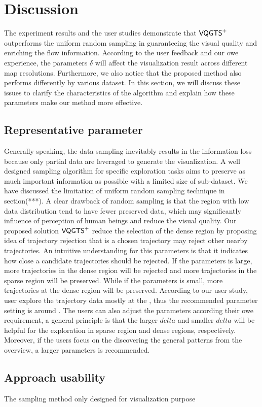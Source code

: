 \section{Discussion}

The experiment results and the user studies demonstrate that $\mathsf{VQGTS}^{+}$ outperforms the uniform random sampling in guaranteeing the visual quality and enriching the flow information. According to the user feedback and our owe experience, the parameters $\delta$ will affect the visualization result across different map resolutions. Furthermore, we also notice that the proposed method also performs differently by various dataset. In this section, we will discuss these issues to clarify the characteristics of the algorithm and explain how these parameters make our method more effective.

\subsection{Representative parameter} 
Generally speaking, the data sampling inevitably results in the information loss because only partial data are leveraged to generate the visualization. A well designed sampling algorithm for specific exploration tasks aims to preserve as much important information as possible with a limited size of sub-dataset. We have discussed the limitation of uniform random sampling technique in section(***). A clear drawback of random sampling is that the region with low data distribution tend to have fewer preserved data, which may significantly influence of perception of human beings and reduce the visual quality. Our proposed solution $\mathsf{VQGTS}^{+}$ reduce the selection of the dense region by proposing idea of trajectory rejection that is a chosen trajectory may reject other nearby trajectories. An intuitive understanding for this parameters is that it indicates how close a candidate trajectories should be rejected. If the parameters is large, more trajectories in the dense region will be rejected and more trajectories in the sparse region will be preserved. While if the parameters is small, more trajectories at the dense region will be preserved. According to our user study, user explore the trajectory data mostly at the , thus the recommended parameter setting is around . The users can also adjust the parameters according their owe requirement, a general principle is that the larger $delta$ and smaller $delta$ will be helpful for the exploration in sparse region and dense regions, respectively. Moreover, if the users focus on the discovering the general patterns from the overview, a larger parameters is recommended.

\subsection{Approach usability}

The sampling method only designed for visualization purpose